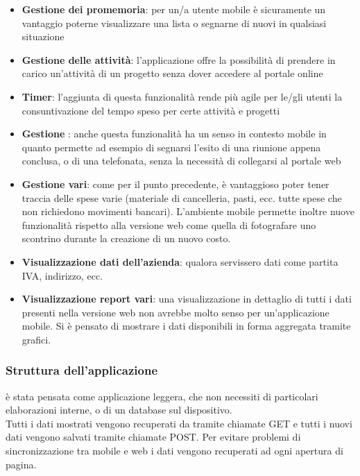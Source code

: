 \begin{itemize}
\item \textbf{Gestione dei promemoria}: per un/a utente mobile è sicuramente un vantaggio
poterne visualizzare una lista o segnarne di nuovi in qualsiasi situazione
\item \textbf{Gestione delle attività}: l'applicazione offre la possibilità di prendere
in carico un'attività di un progetto senza dover accedere al portale online
\item \textbf{Timer}: l'aggiunta di questa funzionalità rende più agile per le/gli utenti
la consuntivazione del tempo speso per certe attività e progetti
\item \textbf{Gestione }: anche questa funzionalità ha un senso in contesto mobile
in quanto permette ad esempio di segnarsi l'esito di una riunione appena conclusa, o di una
telefonata, senza la necessità di collegarsi al portale web
\item \textbf{Gestione  vari}: come per il punto precedente, è vantaggioso poter tener
traccia delle spese varie (materiale di cancelleria, pasti, ecc. tutte spese che non
richiedono movimenti bancari). L'ambiente mobile permette inoltre nuove funzionalità rispetto
alla versione web come quella di fotografare uno scontrino durante la creazione di un nuovo
costo.
\item \textbf{Visualizzazione dati dell'azienda}: qualora servissero dati come partita IVA,
indirizzo, ecc.
\item \textbf{Visualizzazione report vari}: una visualizzazione in dettaglio di tutti i dati
presenti nella versione web non avrebbe molto senso per un'applicazione mobile. Si è pensato
di mostrare i dati disponibili in forma aggregata tramite grafici.
\end{itemize}

\subsubsection{Struttura dell'applicazione}
\fiscoloMobile{} è stata pensata come applicazione leggera, che non necessiti di particolari
elaborazioni interne, o di un database sul dispositivo. \\
Tutti i dati mostrati vengono recuperati da \fiscoloWeb{} tramite chiamate GET e tutti i
nuovi dati vengono salvati tramite chiamate POST. Per evitare problemi di sincronizzazione
tra mobile e web i dati vengono recuperati ad ogni apertura di pagina. \\

